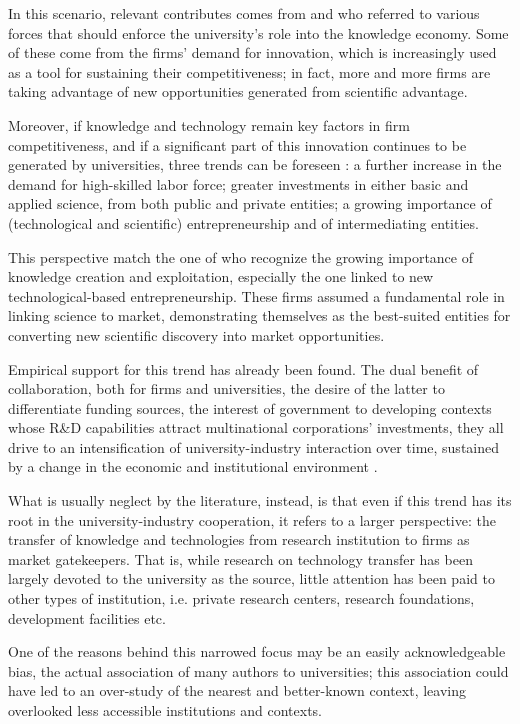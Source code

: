 In this scenario, relevant contributes comes from \citet{OShea2004} and \citet{Yusuf2008} who referred to various forces that should enforce the university's role into the knowledge economy. Some of these come from the firms' demand for innovation, which is increasingly used as a tool for sustaining their competitiveness; in fact, more and more firms are taking advantage of new opportunities generated from scientific advantage. 

Moreover, if knowledge and technology remain key factors in firm competitiveness, and if a significant part of this innovation continues to be generated by universities, three trends can be foreseen \citep{Yusuf2008}: a further increase in the demand for high-skilled labor force; greater investments in either basic and applied science, from both public and private entities; a growing importance of (technological and scientific) entrepreneurship and of intermediating entities. 

This perspective match the one of \citet{OShea2004} who recognize the growing importance of knowledge creation and exploitation, especially the one linked to new technological-based entrepreneurship. These firms assumed a fundamental role in linking science to market, demonstrating themselves as the best-suited entities for converting new scientific discovery into market opportunities. 

Empirical support for this trend has already been found. The dual benefit of collaboration, both for firms and universities, the desire of the latter to differentiate funding sources, the interest of government to developing contexts whose R\&D capabilities attract multinational corporations' investments, they all drive to an intensification of university-industry interaction over time, sustained by a change in the economic and institutional environment \citep{Debackere2005}.

What is usually neglect by the literature, instead, is that even if this trend has its root in the university-industry cooperation, it refers to a larger perspective: the transfer of knowledge and technologies from research institution to firms as market gatekeepers. That is, while research on technology transfer has been largely devoted to the university as the source, little attention has been paid to other types of institution, i.e. private research centers, research foundations, development facilities etc.

One of the reasons behind this narrowed focus may be an easily acknowledgeable bias, the actual association of many authors to universities; this association could have led to an over-study of the nearest and better-known context, leaving overlooked less accessible institutions and contexts.

